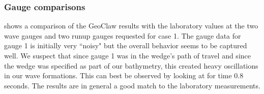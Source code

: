 \subsubsection{Gauge comparisons}

 shows a comparison of the GeoClaw results with the
laboratory values at the two wave gauges and two runup gauges requested
for case 1.  The gauge data for gauge 1 is initially very ``noisy" but the overall
behavior seems to be captured well.  We suspect that since gauge 1 was in
the wedge's path of travel and since the wedge was specified as part of our
bathymetry, this created heavy oscillations in our wave formations.  This can
best be observed by looking at  for time 0.8 seconds.
The results are in general a good match to the laboratory measurements.

